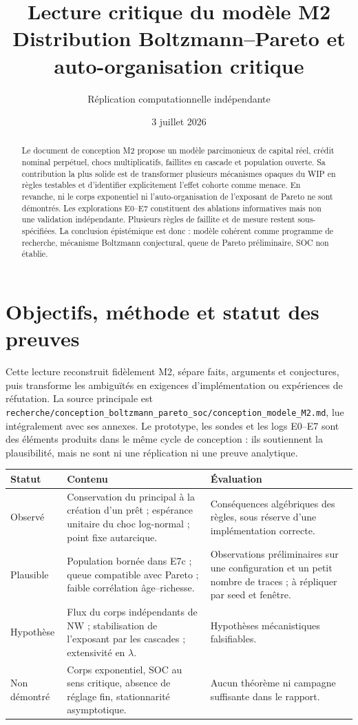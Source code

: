 \documentclass[11pt,a4paper]{article}
\title{Lecture critique du modèle M2\\
\large Distribution Boltzmann--Pareto et auto-organisation critique}
\author{Réplication computationnelle indépendante}
\date{3 juillet 2026}
\newcommand{\NW}{\mathrm{NW}}
\newcommand{\hyp}{\textcolor{orange!70!black}{Hypothèse}}
\newcommand{\plaus}{\textcolor{blue!65!black}{Plausible}}
\newcommand{\obs}{\textcolor{green!45!black}{Observé}}
\newcommand{\und}{\textcolor{red!65!black}{Non démontré}}
\begin{document}
\maketitle

\begin{abstract}
Le document de conception M2 propose un modèle parcimonieux de capital réel,
crédit nominal perpétuel, chocs multiplicatifs, faillites en cascade et
population ouverte. Sa contribution la plus solide est de transformer plusieurs
mécanismes opaques du WIP en règles testables et d'identifier explicitement
l'effet cohorte comme menace. En revanche, ni le corps exponentiel ni
l'auto-organisation de l'exposant de Pareto ne sont démontrés. Les explorations
E0--E7 constituent des ablations informatives mais non une validation
indépendante. Plusieurs règles de faillite et de mesure restent sous-spécifiées.
La conclusion épistémique est donc : modèle cohérent comme programme de
recherche, mécanisme Boltzmann conjectural, queue de Pareto préliminaire, SOC non
établie.
\end{abstract}

\tableofcontents

\section{Objectifs, méthode et statut des preuves}

Cette lecture reconstruit fidèlement M2, sépare faits, arguments et conjectures,
puis transforme les ambiguïtés en exigences d'implémentation ou expériences de
réfutation. La source principale est
\texttt{recherche/conception\_boltzmann\_pareto\_soc/conception\_modele\_M2.md},
lue intégralement avec ses annexes. Le prototype, les sondes et les logs E0--E7
sont des éléments produits dans le même cycle de conception : ils soutiennent
la plausibilité, mais ne sont ni une réplication ni une preuve analytique.

\begin{longtable}{p{}p{}p{}}
\toprule
Statut & Contenu & Évaluation \\
\midrule
\endhead
\obs & Conservation du principal à la création d'un prêt ; espérance unitaire du
choc log-normal ; point fixe autarcique. & Conséquences algébriques des règles,
sous réserve d'une implémentation correcte. \\
\plaus & Population bornée dans E7c ; queue compatible avec Pareto ; faible
corrélation âge--richesse. & Observations préliminaires sur une configuration et
un petit nombre de traces ; à répliquer par seed et fenêtre. \\
\hyp & Flux du corps indépendants de $\NW$ ; stabilisation de l'exposant par les
cascades ; extensivité en $\lambda$. & Hypothèses mécanistiques falsifiables. \\
\und & Corps exponentiel, SOC au sens critique, absence de réglage fin,
stationnarité asymptotique. & Aucun théorème ni campagne suffisante dans le
rapport. \\
\bottomrule
\end{longtable}
\end{document}
